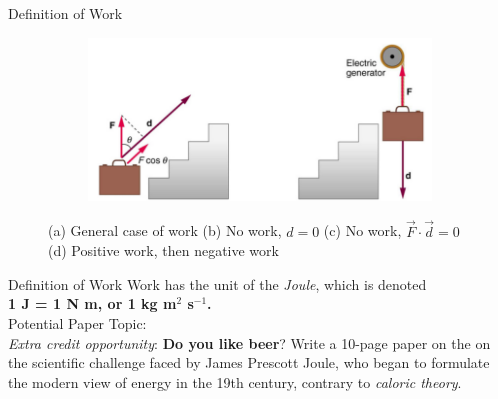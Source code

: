 \documentclass{beamer}
\begin{document}
\begin{frame}{Definition of Work}
\begin{figure}
\begin{subfigure}{0.2\textwidth}
\caption{}
\end{subfigure}
\begin{subfigure}{0.45\textwidth}
\centering
\includegraphics[width=\textwidth]{figures/lawn3.png}
\caption{}
\end{subfigure}
\caption{\label{fig:workvisual}\small (a) General case of work (b) No work, $d=0$ (c) No work, $\vec{F}\cdot\vec{d}=0$ (d) Positive work, then negative work}
\end{figure}
\end{frame}

\begin{frame}{Definition of Work}
Work has the unit of the \textit{Joule}, which is denoted \\ \textbf{1 J = 1 N m, or 1 kg m$^2$ s$^{-1}$.} \\  \vspace{1cm}
\small
\alert{Potential Paper Topic:}\\
\textit{Extra credit opportunity}: \textbf{Do you like beer}?  Write a 10-page paper on the on the scientific challenge faced by James Prescott Joule, who began to formulate the modern view of energy in the 19th century, contrary to \textit{caloric theory}.
\end{frame}
\end{document}
